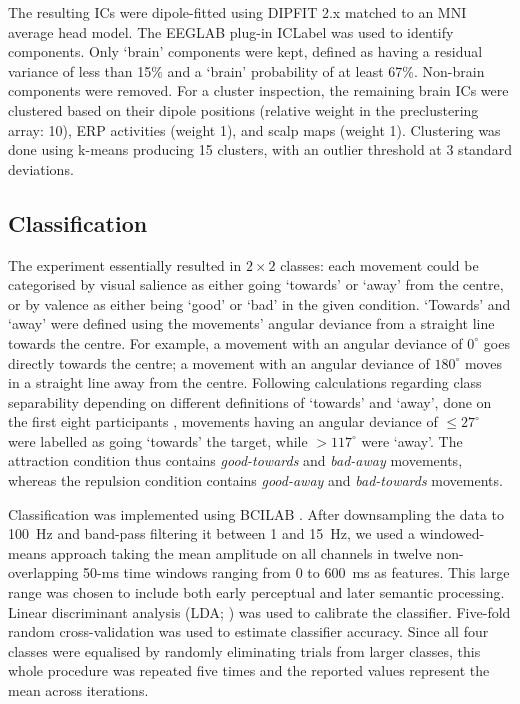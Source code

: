 The resulting ICs were dipole-fitted using DIPFIT 2.x \cite{oostenveld2003dipfit} matched to an MNI average head model. The EEGLAB plug-in ICLabel \cite{piontonachini2019iclabel} was used to identify components. Only `brain' components were kept, defined as having a residual variance of less than 15\% and a `brain' probability of at least 67\%. Non-brain components were removed. For a cluster inspection, the remaining brain ICs were clustered based on their dipole positions (relative weight in the preclustering array: 10), ERP activities (weight 1), and scalp maps (weight 1). Clustering was done using k-means producing 15 clusters, with an outlier threshold at 3 standard deviations.


\subsection{Classification}
\label{salval:sec:methods:classification}

The experiment essentially resulted in $2\times2$ classes: each movement could be categorised by visual salience as either going `towards' or `away' from the centre, or by valence as either being `good' or `bad' in the given condition. `Towards' and `away' were defined using the movements' angular deviance from a straight line towards the centre. For example, a movement with an angular deviance of $0^{\circ}$ goes directly towards the centre; a movement with an angular deviance of $180^{\circ}$ moves in a straight line away from the centre. Following calculations regarding class separability depending on different definitions of `towards' and `away', done on the first eight participants \cite{krol2019saliencevalence}, movements having an angular deviance of $\leq27^{\circ}$ were labelled as going `towards' the target, while $>117^{\circ}$ were `away'. The attraction condition thus contains \emph{good-towards} and \emph{bad-away} movements, whereas the repulsion condition contains \emph{good-away} and \emph{bad-towards} movements.

Classification was implemented using BCILAB \cite{kothe2013bcilab}. After downsampling the data to 100~Hz and band-pass filtering it between 1 and 15~Hz, we used a windowed-means approach \cite{blankertz2011} taking the mean amplitude on all channels in twelve non-overlapping 50-ms time windows ranging from 0 to 600~ms as features. This large range was chosen to include both early perceptual and later semantic processing. Linear discriminant analysis (LDA; ) was used to calibrate the classifier. Five-fold random cross-validation was used to estimate classifier accuracy. Since all four classes were equalised by randomly eliminating trials from larger classes, this whole procedure was repeated five times and the reported values represent the mean across iterations.


